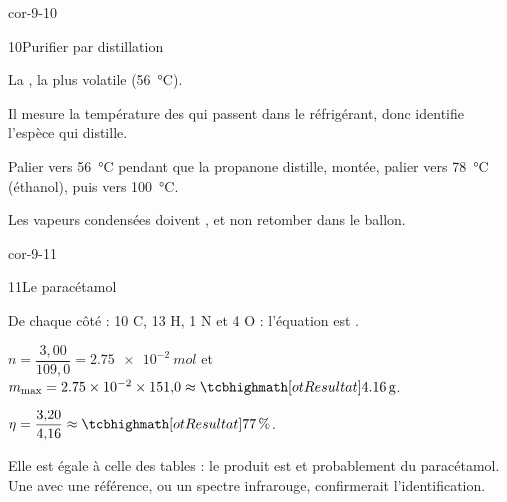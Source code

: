 \begin{blocLivre}{cor-9-10}
\begin{corrige}{10}{Purifier par distillation}
\begin{questions}
\item La , la plus volatile (\qty{56}{\degreeCelsius}).
\item Il mesure la température des  qui passent dans le réfrigérant, donc identifie l'espèce qui distille.
\item Palier vers \qty{56}{\degreeCelsius} pendant que la propanone distille, montée, palier vers \qty{78}{\degreeCelsius} (éthanol), puis vers
\qty{100}{\degreeCelsius}.
\item Les vapeurs condensées doivent , et non retomber dans le ballon.
\end{questions}
\end{corrige}
\end{blocLivre}
\begin{blocLivre}{cor-9-11}
\begin{corrige}{11}{Le paracétamol}
\begin{questions}
\item De chaque côté : 10 C, 13 H, 1 N et 4 O : l'équation est .
\item $n=\dfrac{3{,}00}{109{,}0}=\qty{2,75e-2}{mol}$ et $m_\text{max}=\num{2.75e-2}\times151{,}0\approx\res{\qty{4,16}{g}}$.
\item $\eta=\dfrac{3{,}20}{4{,}16}\approx\res{\qty{77}{\percent}}$.
\item Elle est égale à celle des tables : le produit est  et probablement du paracétamol. Une  avec une
référence, ou un spectre infrarouge, confirmerait l'identification.
\end{questions}
\end{corrige}
\end{blocLivre}
